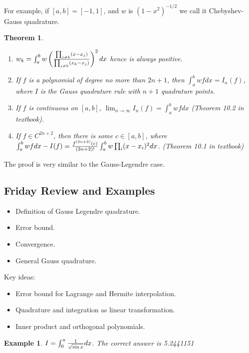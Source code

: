 \documentclass{article} %
\theoremstyle{break}
\newtheorem{exa}[definition]{Example}
\newtheorem{thm}[definition]{Theorem}
\begin{document}
 For example, if $[a, b]=[-1, 1]$, and $w$ is $(1-x^2)^{-1/2}$ we call it Chebyshev-Gauss quadrature.

\begin{thm}
  \begin{enumerate}
  \item $w_k=\int_a^bw\left({\prod_{j\not=k}(x-x_j)\over \prod_{j\not=k}(x_k-x_j)}\right)^2dx$ hence is always positive.
\item If $f$ is a polynomial of degree no more than $2n+1$, then $\int_a^bwfdx=I_n(f)$, where $I$ is the Gauss quadrature rule with $n+1$ quadrature points.
\item If $f$ is continuous on $[a, b]$, $\lim_{n\rightarrow\infty}I_n(f)=\int_a^bwfdx$ (Theorem 10.2 in textbook).
\item If $f\in C^{2n+2}$, then there is some $c\in [a, b]$, where $\int_a^bwfdx-I(f)={f^{(2n+2)}(c)\over (2n+2)!}\int_a^bw\prod_i(x-x_i)^2 dx$. (Theorem 10.1 in textbook)
  \end{enumerate}
\end{thm}

The proof is very similar to the Gauss-Legendre case.


\subsection{Friday Review and Examples}

\begin{itemize}
\item Definition of Gauss Legendre quadrature.
\item Error bound.
\item Convergence.
\item General Gauss quadrature.
\end{itemize}

Key ideas:

\begin{itemize}
\item Error bound for Lagrange and Hermite interpolation.
\item Quadrature and integration as linear transformation.
\item Inner product and orthogonal polynomials.
\end{itemize}


\begin{exa}$I=\int_0^\pi{1\over \sqrt{\sin x}}dx$. The correct answer is 5.2441151\end{exa}
\end{document}
